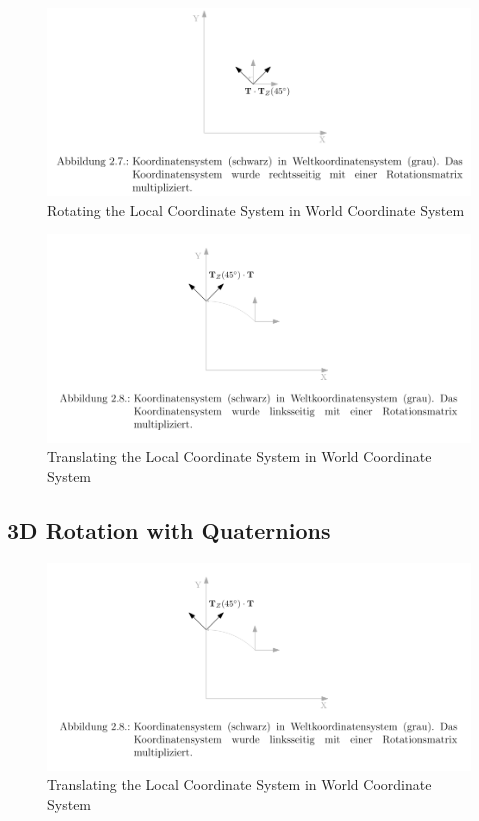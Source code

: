 \documentclass[a4paper]{report}
\numberwithin{figure}{section}
\begin{document}
\begin{figure}[H]
	\centering
	\includegraphics[width=\linewidth,natwidth=640,natheight=640]
	{fig/ref_imgs/2d_rotation.png}
  \caption{Rotating the Local Coordinate System in World Coordinate System}
	\label{fig:2d_rotation}
\end{figure}

\begin{figure}[H]
	\centering
	\includegraphics[width=\linewidth,natwidth=640,natheight=640]
	{fig/ref_imgs/2d_translation.png}
  \caption{Translating the Local Coordinate System in World Coordinate System}
	\label{fig:2d_rotation}
\end{figure}




\subsection{3D Rotation with Quaternions}


\begin{figure}[H]
	\centering
	\includegraphics[width=\linewidth,natwidth=640,natheight=640]
	{fig/ref_imgs/2d_translation.png}
  \caption{Translating the Local Coordinate System in World Coordinate System}
	\label{fig:2d_rotation}
\end{figure}
\end{document}
